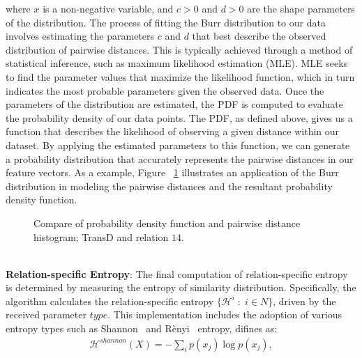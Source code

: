 \documentclass{article}
\begin{document}
where $x$ is a non-negative variable, and $c > 0$ and $d > 0$ are the shape parameters of the distribution. The process of fitting the Burr distribution to our data involves estimating the parameters $c$ and $d$ that best describe the observed distribution of pairwise distances. This is typically achieved through a method of statistical inference, such as maximum likelihood estimation (MLE). MLE seeks to find the parameter values that maximize the likelihood function, which in turn indicates the most probable parameters given the observed data. Once the parameters of the distribution are estimated, the PDF is computed to evaluate the probability density of our data points. The PDF, as defined above, gives us a function that describes the likelihood of observing a given distance within our dataset. By applying the estimated parameters to this function, we can generate a probability distribution that accurately represents the pairwise distances in our feature vectors. As a example, Figure ~\ref{fig:pdfhist} illustrates an application of the Burr distribution in modeling the pairwise distances and the resultant probability density function. 
\bgroup
\begin{figure}[b!]
  \centering \makeatletter{}
  \makeatother
  \caption{{Compare of probability density function and pairwise distance histogram; TransD and relation $14$.}}
  \label{fig:pdfhist}
  \hfill
\end{figure}
\egroup
\\
\textbf{Relation-specific Entropy}: The final computation of relation-specific entropy is determined by measuring the entropy of similarity distribution. Specifically, the algorithm calculates the relation-specific entropy $\{\mathcal{H}^{i} \;:\; i \in N\}$, driven by the received parameter $type$. This implementation includes the adoption of various entropy types such as Shannon~\cite{shannon1948mathematical} and R\`enyi~\cite{renyi1961measures} entropy, difines as:
\begin{align}
    \label{eq:shannon}
    \mathcal{H}^{shannon}(X) = -\sum_{i} p(x_j) \log p(x_j), 
\end{align}%
\end{document}
